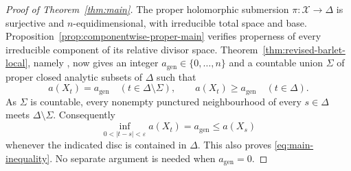 \documentclass[11pt]{amsart}
\numberwithin{equation}{section}
\theoremstyle{plain}
\theoremstyle{definition}
\newcommand{\cX}{\mathcal X}
\begin{document}
\begin{proof}[Proof of Theorem~\ref{thm:main}]
The proper holomorphic submersion $\pi:\cX\to\Delta$ is surjective
and $n$-equidimensional, with irreducible total space and base.
Proposition~\ref{prop:componentwise-proper-main} verifies properness
of every irreducible component of its relative divisor space.
Theorem~\ref{thm:revised-barlet-local}, namely
\cite[Proposition~4.0.8]{Ba15}, now gives an integer
$a_{\mathrm{gen}}\in\{0,\ldots,n\}$ and a countable union $\Sigma$
of proper closed analytic subsets of $\Delta$ such that
\[
 a(X_t)=a_{\mathrm{gen}}\quad(t\in\Delta\setminus\Sigma),
 \qquad a(X_t)\ge a_{\mathrm{gen}}\quad(t\in\Delta).
\]
As $\Sigma$ is countable, every nonempty punctured neighbourhood of
every $s\in\Delta$ meets $\Delta\setminus\Sigma$.  Consequently
\[
 \inf_{0<|t-s|<\varepsilon}a(X_t)=a_{\mathrm{gen}}\le a(X_s)
\]
whenever the indicated disc is contained in $\Delta$.
This also proves \eqref{eq:main-inequality}.  No separate argument
is needed when $a_{\mathrm{gen}}=0$.
\end{proof}
\end{document}
